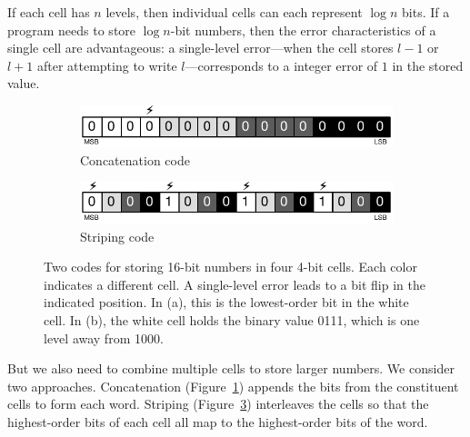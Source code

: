 If each cell has $n$ levels, then individual cells can each
represent $\log n$ bits. If a program needs to store $\log n$-bit
numbers, then the error characteristics of a single cell are
advantageous: a single-level
error---when the cell stores $l-1$ or $l+1$ after attempting to write
$l$---corresponds to a integer error of $1$ in the stored value.

\begin{figure}
    \begin{subfigure}{0.5\columnwidth}
        \centering
        \includegraphics[scale=0.65]{figs/coding-chunk}
        \caption{Concatenation code}
        \label{approxstorage:fig:coding-chunk}
    \end{subfigure}
    \begin{subfigure}{0.5\columnwidth}
        \centering
        \includegraphics[scale=0.65]{figs/coding-stripe}
        \caption{Striping code}
        \label{approxstorage:fig:coding-stripe}
    \end{subfigure}
    \caption{
        Two codes for storing 16-bit numbers in four
        4-bit cells. Each color indicates a different cell.
        A single-level error leads to a bit flip in the indicated
        position.
        In (a), this is the lowest-order bit in the white cell.
        In (b), the white cell holds the binary value 0111, which is one level
        away from 1000.
    }
\end{figure}

But we also need to combine multiple cells to store larger numbers.
We consider two approaches. Concatenation
(Figure~\ref{approxstorage:fig:coding-chunk}) appends the bits from the
constituent cells to form each word. Striping
(Figure~\ref{approxstorage:fig:coding-stripe}) interleaves the cells so that the highest-order
bits of each cell all map to the highest-order bits of the word.

